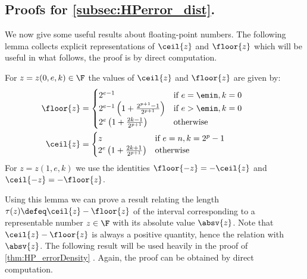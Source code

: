 \subsection*{Proofs for \cref{subsec:HPerror_dist}.}

We now give some useful results about floating-point numbers.
The following lemma collects explicit representations of $\ceil{z}$ and $\floor{z}$ which will be useful in what follows, the proof is by direct computation.
\begin{lemma}\label{lem:floorceil}
For $z=z(0,e,k)\in \F$ the values of $\ceil{z}$ and $\floor{z}$ are given by: 
\begin{align*}
\floor{z}& =
\begin{cases}
2^{e-1} & \text{if }e=\emin, k=0\\
2^{e-1}\left(1+\frac{2^{p+1}-1}{2^{p+1}}\right) & \text{if }e>\emin, k=0\\
2^e\left(1+\frac{2k-1}{2^{p+1}}\right) & \text{otherwise}
\end{cases} 
& \qquad & \\
\ceil{z}&=\begin{cases}
z&\text{if }e=n, k=2^p-1\\
2^e\left(1+\frac{2k+1}{2^{p+1}}\right) & \text{otherwise}
\end{cases}
\end{align*}
For $z=z(1,e,k)$ we use the identities $\floor{-z}=-\ceil{z}$ and $\ceil{-z}=-\floor{z}$.
\end{lemma}

Using this lemma we can prove a result relating the length $\tau(z)\defeq\ceil{z}-\floor{z}$ of the interval corresponding to a representable number $z\in\F$ with its absolute value $\absv{z}$. Note that $\ceil{z}-\floor{z}$ is always a positive quantity, hence the relation with $\absv{z}$. The following result will be used heavily in the proof of \cref{thm:HP_errorDensity} . Again, the proof can be obtained by direct computation.

